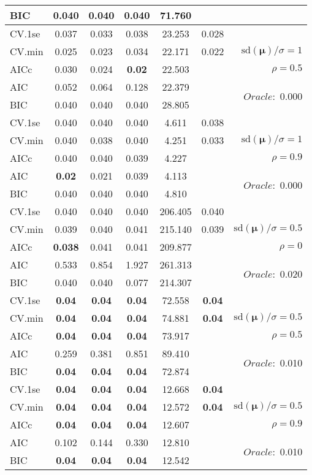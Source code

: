 \begin{table}
\begin{center}
\begin{tabular}{l*{5}{c}|r}
BIC & 0.040 & 0.040 & 0.040 & 71.760 & &  \\
 \hline 
CV.1se & 0.037 & 0.033 & 0.038 & 23.253 & 0.028 & \\
CV.min & 0.025 & 0.023 & 0.034 & 22.171 & 0.022 &  $\mathrm{sd}(\mathbf{\mu})/\sigma=1$ \\
AICc & 0.030 & 0.024 & {\bf 0.02} & 22.503 & & $\rho=0.5$ \\
AIC & 0.052 & 0.064 & 0.128 & 22.379 & &  \multirow{2}{*}{$Oracle: $ 0.000} \\
BIC & 0.040 & 0.040 & 0.040 & 28.805 & &  \\
 \hline 
CV.1se & 0.040 & 0.040 & 0.040 & 4.611 & 0.038 & \\
CV.min & 0.040 & 0.038 & 0.040 & 4.251 & 0.033 &  $\mathrm{sd}(\mathbf{\mu})/\sigma=1$ \\
AICc & 0.040 & 0.040 & 0.039 & 4.227 & & $\rho=0.9$ \\
AIC & {\bf 0.02} & 0.021 & 0.039 & 4.113 & &  \multirow{2}{*}{$Oracle: $ 0.000} \\
BIC & 0.040 & 0.040 & 0.040 & 4.810 & &  \\
 \hline 
CV.1se & 0.040 & 0.040 & 0.040 & 206.405 & 0.040 & \\
CV.min & 0.039 & 0.040 & 0.041 & 215.140 & 0.039 &  $\mathrm{sd}(\mathbf{\mu})/\sigma=0.5$ \\
AICc & {\bf 0.038} & 0.041 & 0.041 & 209.877 & & $\rho=0$ \\
AIC & 0.533 & 0.854 & 1.927 & 261.313 & &  \multirow{2}{*}{$Oracle: $ 0.020} \\
BIC & 0.040 & 0.040 & 0.077 & 214.307 & &  \\
 \hline 
CV.1se & {\bf 0.04} & {\bf 0.04} & {\bf 0.04} & 72.558 & {\bf 0.04} & \\
CV.min & {\bf 0.04} & {\bf 0.04} & {\bf 0.04} & 74.881 & {\bf 0.04} &  $\mathrm{sd}(\mathbf{\mu})/\sigma=0.5$ \\
AICc & {\bf 0.04} & {\bf 0.04} & {\bf 0.04} & 73.917 & & $\rho=0.5$ \\
AIC & 0.259 & 0.381 & 0.851 & 89.410 & &  \multirow{2}{*}{$Oracle: $ 0.010} \\
BIC & {\bf 0.04} & {\bf 0.04} & {\bf 0.04} & 72.874 & &  \\
 \hline 
CV.1se & {\bf 0.04} & {\bf 0.04} & {\bf 0.04} & 12.668 & {\bf 0.04} & \\
CV.min & {\bf 0.04} & {\bf 0.04} & {\bf 0.04} & 12.572 & {\bf 0.04} &  $\mathrm{sd}(\mathbf{\mu})/\sigma=0.5$ \\
AICc & {\bf 0.04} & {\bf 0.04} & {\bf 0.04} & 12.607 & & $\rho=0.9$ \\
AIC & 0.102 & 0.144 & 0.330 & 12.810 & &  \multirow{2}{*}{$Oracle: $ 0.010} \\
BIC & {\bf 0.04} & {\bf 0.04} & {\bf 0.04} & 12.542 & &  \\
 \hline 
\end{tabular}
\end{center}
\vspace{-1cm}
\end{table}




